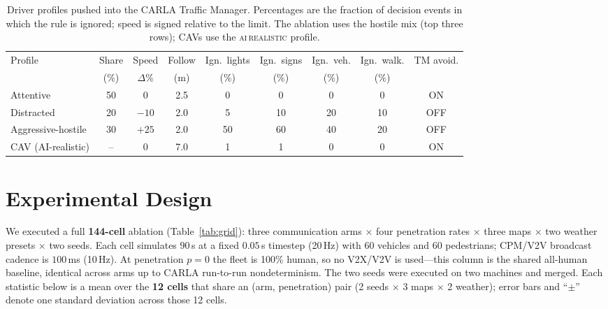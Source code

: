 \documentclass[11pt]{article}
\begin{document}
\begin{table}[t]
  \centering
  \caption{Driver profiles pushed into the CARLA Traffic Manager. Percentages are
  the fraction of decision events in which the rule is ignored; speed is signed
  relative to the limit. The ablation uses the hostile mix (top three rows); CAVs
  use the \textsc{ai\,realistic} profile.}
  \label{tab:profiles}
  \small
  \begin{tabular}{lcccccccc}
    \toprule
    Profile & Share & Speed & Follow & Ign.\ lights & Ign.\ signs
            & Ign.\ veh. & Ign.\ walk. & TM avoid. \\
            & (\%)  & $\Delta$\% & (m) & (\%) & (\%) & (\%) & (\%) & \\
    \midrule
    Attentive            & 50 & $0$   & 2.5 & 0  & 0  & 0  & 0  & ON  \\
    Distracted           & 20 & $-10$ & 2.0 & 5  & 10 & 20 & 10 & OFF \\
    Aggressive-hostile   & 30 & $+25$ & 2.0 & 50 & 60 & 40 & 20 & OFF \\
    \midrule
    CAV (AI-realistic)   & -- & $0$   & 7.0 & 1  & 1  & 0  & 0  & ON  \\
    \bottomrule
  \end{tabular}
\end{table}

\section{Experimental Design}
We executed a full \textbf{144-cell} ablation (Table~\ref{tab:grid}): three
communication arms $\times$ four penetration rates $\times$ three maps $\times$
two weather presets $\times$ two seeds. Each cell simulates $90$\,s at a fixed
$0.05$\,s timestep (20\,Hz) with 60 vehicles and 60 pedestrians; CPM/V2V broadcast
cadence is $100$\,ms (10\,Hz). At penetration $p=0$ the fleet is 100\% human, so no
V2X/V2V is used---this column is the shared all-human baseline, identical across
arms up to CARLA run-to-run nondeterminism. The two seeds were executed on two
machines and merged. Each statistic below is a mean over the \textbf{12 cells} that
share an (arm, penetration) pair (2 seeds $\times$ 3 maps $\times$ 2 weather);
error bars and ``$\pm$'' denote one standard deviation across those 12 cells.
\end{document}
